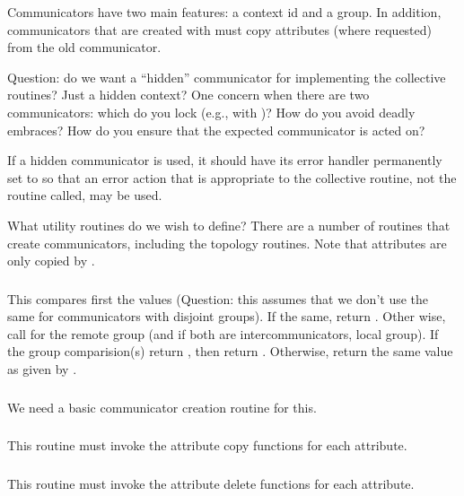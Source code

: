 \documentclass{article}
\begin{document}
Communicators have two main features: a context id and a group.  In
addition, communicators that are created with  must
copy attributes (where requested) from the old communicator.

Question: do we want a ``hidden'' communicator for implementing the
collective routines?  Just a hidden context?  One concern when there
are two communicators: which do you lock (e.g., with
)?  How do you avoid deadly embraces?  How do
you 
ensure that the expected communicator is acted on?

If a hidden communicator is used, it should have its error handler permanently
set to  so that an error action that is appropriate to
the collective routine, not the routine called, may be used.

What utility routines do we wish to define?  There are a number of
routines that create communicators, including the topology routines.
Note that attributes are only copied by .

\subsubsection{}
This compares first the  values (Question: this assumes that
we don't use the same  for communicators with disjoint
groups).  If the same, return .  Other wise, call
 for the remote group (and if both are
intercommunicators, local group).  If the group comparision(s) return
, then return .  Otherwise, return
the same value as given by .

\subsubsection{}
We need a basic communicator creation routine for this.

\subsubsection{}
This routine must invoke the attribute copy functions for each attribute.

\subsubsection{}
This routine must invoke the attribute delete functions for each attribute.
\end{document}
